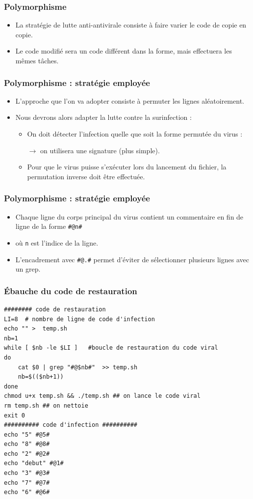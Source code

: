 \documentclass{beamer}
\begin{document}
\begin{frame}
  \frametitle{Polymorphisme}
\begin{itemize}
\item La stratégie de lutte \alert{anti-antivirale} consiste à faire varier le code de copie en copie.
\item Le code modifié sera un code différent dans la forme, mais effectuera les mêmes tâches.
\end{itemize}
\end{frame}
\begin{frame}
  \frametitle{Polymorphisme : stratégie employée}
  \begin{itemize}
\item L'approche que l'on va adopter consiste à \alert{ permuter les lignes aléatoirement.}
\item Nous devrons alors adapter la lutte contre la surinfection :
\begin{itemize}
\item On doit détecter l'infection quelle que soit la forme permutée du virus :
  \begin{center}
    $\to$ on utilisera une signature (plus simple).
    \end{center}
\item Pour que le virus puisse s'exécuter lors du lancement du fichier, la permutation inverse doit être effectuée.
\end{itemize}
\end{itemize}
\end{frame}




\begin{frame}[fragile]
  \frametitle{Polymorphisme : stratégie employée}
\begin{itemize}
\item Chaque ligne du corps principal du virus contient un commentaire en fin de ligne de la forme {\color{blue}\texttt{\#@n\#} }
\item où {\color{blue} \texttt{n}} est l'indice de la ligne.
\item L'encadrement avec {\color{blue} \texttt{\#@.\#}} permet d'éviter de sélectionner plusieurs lignes avec un grep.
\end{itemize}
\end{frame}


\begin{frame}[fragile]
  \frametitle{Ébauche du code de restauration}
  \begin{scriptsize}
\begin{verbatim}
######## code de restauration
LI=8  # nombre de ligne de code d'infection
echo "" >  temp.sh
nb=1
while [ $nb -le $LI ]   #boucle de restauration du code viral
do
    cat $0 | grep "#@$nb#"  >> temp.sh
    nb=$(($nb+1))
done
chmod u+x temp.sh && ./temp.sh ## on lance le code viral
rm temp.sh ## on nettoie
exit 0
########## code d'infection ##########
echo "5" #@5#
echo "8" #@8#
echo "2" #@2#
echo "debut" #@1#
echo "3" #@3#
echo "7" #@7#
echo "6" #@6#
\end{verbatim}
\end{scriptsize}
\end{frame}
\end{document}
